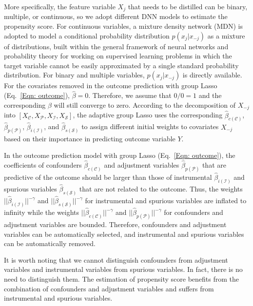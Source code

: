 \documentclass[letterpaper]{article} %
\theoremstyle{definition}
\theoremstyle{remark}
\begin{document}
More specifically, the feature variable $X_j$ that needs to be distilled can be binary, multiple, or continuous, so we adopt different DNN models to estimate the propensity score. For continuous variables, a mixture density network (MDN) \cite{bishop1994mixture} is adopted to model a conditional probability distribution $p(x_j|x_{-j})$ as a mixture of distributions, built within the general framework of neural networks and probability theory for working on supervised learning problems in which the target variable cannot be easily approximated by a single standard probability distribution. For binary and multiple variables, $p(x_j|x_{-j})$ is directly available. For the covariates removed in the outcome prediction with group Lasso (Eq.~\eqref{Eqn: outcome}), $\widehat{\beta}=0$. Therefore, we assume that $0/0=1$ and the corresponding $\beta$ will still converge to zero. According to the decomposition of $X_{-j}$ into $[X_\mathcal{C}, X_\mathcal{P}, X_\mathcal{I}, X_\mathcal{S}]$, the adaptive group Lasso uses the corresponding $\widehat{\beta}_{c(\mathcal{C})}$, $\widehat{\beta}_{p(\mathcal{P})}$, $\widehat{\beta}_{i(\mathcal{I})}$, and $\widehat{\beta}_{s(\mathcal{S})}$ to assign different initial weights to covariates $X_{-j}$ based on their importance in predicting outcome variable $Y$. 

In the outcome prediction model with group Lasso (Eq.~\eqref{Eqn: outcome}), the coefficients of confounders $\widehat{\beta}_{c(\mathcal{C})}$ and adjustment variables $\widehat{\beta}_{p(\mathcal{P})}$ that are predictive of the outcome should be larger than those of instrumental $\widehat{\beta}_{i(\mathcal{I})}$ and spurious variables $\widehat{\beta}_{s(\mathcal{S})}$ that are not related to the outcome. Thus, the weights ${||\widehat{\beta}_{i(\mathcal{I})}||^{-\gamma}}$ and ${||\widehat{\beta}_{s(\mathcal{S})}||^{-\gamma}}$ for instrumental and spurious variables are inflated to infinity while the weights ${||\widehat{\beta}_{c(\mathcal{C})}||^{-\gamma}}$ and ${||\widehat{\beta}_{p(\mathcal{P})}||^{-\gamma}}$ for confounders and adjustment variables are bounded. Therefore, confounders and adjustment variables can be automatically selected, and instrumental and spurious variables can be automatically removed. 

It is worth noting that we cannot distinguish confounders from adjustment variables and instrumental variables from spurious variables. In fact, there is no need to distinguish them. The estimation of propensity score benefits from the combination of confounders and adjustment variables and suffers from instrumental and spurious variables.
\end{document}
